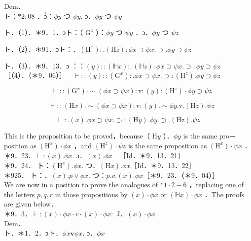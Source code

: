 \documentclass[10pt]{article}
\begin{document}
Dem．\\
ト：$* 2: 08$ ．ɔํ：$\phi y$ つ $\psi y$. ɔ．$\phi y$ つ $\psi y$

ト．（1）．＊9．1．ɔト：（ $\mathrm{G}^{z}$ ）：$\phi y$ つ $\psi y$ ．ɔ．$\phi y$ つ $\psi z$

ト．（2）．＊91．ɔト：．$\left(\mathrm{H}^{x}\right): .(\mathrm{H} z): \phi x \supset \psi x . \supset . \phi y \supset \psi z$

ト．（3）．＊9．13．ɔ ：：$(y)::(\mathbb{H} x): .(\mathbb{H} z): \phi x \supset \psi x . \supset: \phi y \supset \psi z$\\
［（4）．（＊9．06）］$\quad \vdash::(y)::\left(\mathrm{G}^{x}\right): . \phi x \supset \psi x . \supset:\left(\mathrm{H}^{z}\right) . \phi y \supset \psi z$


\begin{equation*}
[(5) \cdot(* 1 \cdot 01 \cdot * 9 \cdot 08)] \quad \vdash::\left(\mathrm{G}^{x}\right) \cdot \sim(\phi x \supset \psi x): \mathrm{v}:(y):\left(\mathrm{H}^{z}\right) \cdot \phi y \supset \psi z \tag{5}
\end{equation*}



\begin{equation*}
[(6) .(* 1.01 . * 9.07)] \quad \vdash::(\mathrm{H} x) . \sim(\phi x \supset \psi x): \mathrm{v}:(y) . \sim \phi y . \mathrm{v} .(\mathrm{H} z) . \psi z \tag{6}
\end{equation*}



\begin{equation*}
[(7) .(* 1.01 . * 9.01 .02)] \vdash: .(x) . \phi x \supset \psi x . \supset:(\mathrm{H} y) . \phi y . \supset .(\mathrm{Hz}) . \psi z \tag{7}
\end{equation*}


This is the proposition to be proved，because（ $\mathrm{H} y$ ）．$\phi y$ is the same pro－ position as $\left(\mathrm{H}^{x}\right) \cdot \phi x$ ，and $\left(\mathrm{H}^{z}\right) \cdot \psi z$ is the same proposition as $\left(\mathrm{H}^{x}\right) \cdot \psi x$ ．\\
＊9．23．$\vdash:(x) . \phi x$. ɔ．$(x) . \phi x \quad$［Id．＊9．13．21］\\
＊9．24． ト：$\left(\mathrm{H}^{x}\right) . \phi x$. つ．$(\mathrm{H} x) . \phi x$［Id．＊9．13．22］\\
＊925． ト：．$(x) . p \vee \phi x$. つ：$p . v .(x) . \phi x$［＊9．23．（＊9．04）］\\
We are now in a position to prove the analogues of $* 1 \cdot 2-6$ ，replacing one of the letters $p, q, r$ in those propositions by $(x) \cdot \phi x$ or $(\mathbb{H} x) \cdot \phi x$ ．The proofs are given below．\\
＊9．3．$\vdash:(x) \cdot \phi x \cdot v \cdot(x) \cdot \phi x:$ J．$(x) \cdot \phi x$\\
Dem．\\
ト．＊1．2．ɔト．$\phi x \mathbf{v} \phi x$. ɔ．$\phi x$
\end{document}

